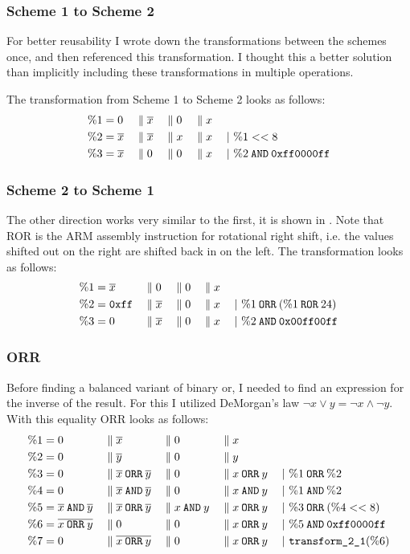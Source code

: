 \subsubsection{Scheme 1 to Scheme 2}
For better reusability I wrote down the transformations between the schemes once, and then referenced this transformation.
I thought this a better solution than implicitly including these transformations in multiple operations.

The transformation from Scheme 1 to Scheme 2 looks as follows:
\begin{align*}
  \binp{1}{0}{\neg{x}}{0}{x}\\
  \btrans{2}{\neg{x}}{\neg{x}}{x}{x}{\%1 << 8}\\
  \btrans{3}{\neg{x}}{0}{0}{x}{\%2 \band \hex{ff0000ff}}
\end{align*}

\subsubsection{Scheme 2 to Scheme 1}
The other direction works very similar to the first, it is shown in .
Note that ROR is the ARM assembly instruction for rotational right shift, i.e. the values shifted out on the right are shifted back in on the left.
The transformation looks as follows:
\begin{align*}
  \binp{1}{\neg{x}}{0}{0}{x}\\
  \btrans{2}{\hex{ff}}{\neg{x}}{0}{x}{\%1 \borr (\%1 \bror 24)}\\
  \btrans{3}{0}{\neg{x}}{0}{x}{\%2 \band \hex{00ff00ff}}
\end{align*}

\subsubsection{ORR}
Before finding a balanced variant of binary or, I needed to find an expression for the inverse of the result.
For this I utilized DeMorgan's law $\neg{x \lor y} = \neg{x} \land \neg{y}$.
With this equality ORR looks as follows:
\begin{align*}
  \binp{1}{0}{\neg{x}}{0}{x}\\
  \binp{2}{0}{\neg{y}}{0}{y}\\
  \btrans{3}{0}{\neg{x} \borr \neg{y}}{0}{x \borr y}{\%1 \borr \%2}\\
  \btrans{4}{0}{\neg{x} \band \neg{y}}{0}{x \band y}{\%1 \band \%2}\\
  \btrans{5}{\neg{x} \band \neg{y}}{\neg{x} \borr \neg{y}}{x \band y}{x \borr y}{\%3 \borr (\%4 << 8)}\\
  \btrans{6}{\neg{x \borr y}}{0}{0}{x \borr y}{\%5 \band \hex{ff0000ff}}\\
  \btrans{7}{0}{\neg{x \borr y}}{0}{x \borr y}{\trans21(\%6)}
\end{align*}

